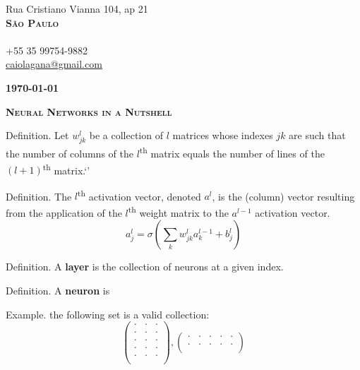 \documentclass[twoside]{letter}
\begin{document}
\justifying

\parbox{\linewidth}
{
\begin{flushright}
Rua Cristiano Vianna 104, ap 21\\
\textbf{\textsc{São Paulo}}\\
\mbox{}\\
+55 35 99754-9882\\
\href{mailto:caiolagana@gmail.com}{caiolagana@gmail.com}
\end{flushright}
}

\textbf{\today}


\vspace{2em}

\begin{center}\textsc{\Large \textbf{Neural Networks in a Nutshell}}\end{center}

Definition. Let $w^l_{jk}$ be a collection of $l$ matrices whose indexes $jk$ are such that the number of columns of the $l$\textsuperscript{th} matrix equals the number of lines of the $(l+1)$\textsuperscript{th} matrix.`'


Definition. The $l$\textsuperscript{th} activation vector, denoted $a^l$, is the (column) vector resulting from the application of the $l$\textsuperscript{th} weight matrix to the $a^{l-1}$ activation vector.
\[
  a^l_j = \sigma \left(\sum_k w^l_{jk}a^{l-1}_k+b^l_j\right)
\]

Definition. A {\bf layer} is the collection of neurons at a given index.

Definition. A {\bf neuron} is 

Example. the following set is a valid collection:
\[
    \begin{pmatrix}
    \cdot & \cdot & \cdot \\
    \cdot & \cdot & \cdot \\
    \cdot & \cdot & \cdot \\
    \cdot & \cdot & \cdot \\
    \cdot & \cdot & \cdot \\
    \end{pmatrix}
    ,
    \begin{pmatrix}
    \cdot & \cdot & \cdot & \cdot & \cdot \\
    \cdot & \cdot & \cdot & \cdot & \cdot \\
    \end{pmatrix}
\]
\end{document}
